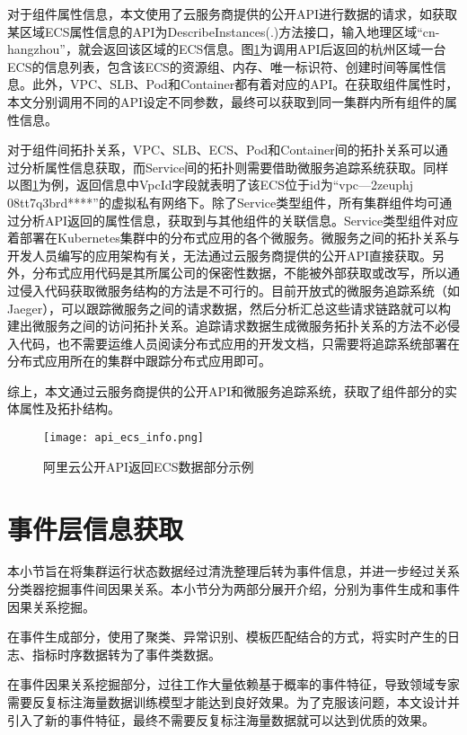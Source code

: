 对于组件属性信息，本文使用了云服务商提供的公开API进行数据的请求，如获取某区域ECS属性信息的API为DescribeInstances(.)方法接口，输入地理区域“cn-hangzhou”，就会返回该区域的ECS信息。图\ref{api_ecs_info}为调用API后返回的杭州区域一台ECS的信息列表，包含该ECS的资源组、内存、唯一标识符、创建时间等属性信息。此外，VPC、SLB、Pod和Container都有着对应的API。在获取组件属性时，本文分别调用不同的API设定不同参数，最终可以获取到同一集群内所有组件的属性信息。

对于组件间拓扑关系，VPC、SLB、ECS、Pod和Container间的拓扑关系可以通过分析属性信息获取，而Service间的拓扑则需要借助微服务追踪系统获取。同样以图\ref{api_ecs_info}为例，返回信息中VpcId字段就表明了该ECS位于id为“vpc—2zeuphj 08tt7q3brd****”的虚拟私有网络下。除了Service类型组件，所有集群组件均可通过分析API返回的属性信息，获取到与其他组件的关联信息。Service类型组件对应着部署在Kubernetes集群中的分布式应用的各个微服务。微服务之间的拓扑关系与开发人员编写的应用架构有关，无法通过云服务商提供的公开API直接获取。另外，分布式应用代码是其所属公司的保密性数据，不能被外部获取或改写，所以通过侵入代码获取微服务结构的方法是不可行的。目前开放式的微服务追踪系统（如Jaeger\cite{mengistu2020distributed}），可以跟踪微服务之间的请求数据，然后分析汇总这些请求链路就可以构建出微服务之间的访问拓扑关系。追踪请求数据生成微服务拓扑关系的方法不必侵入代码，也不需要运维人员阅读分布式应用的开发文档，只需要将追踪系统部署在分布式应用所在的集群中跟踪分布式应用即可。

综上，本文通过云服务商提供的公开API和微服务追踪系统，获取了组件部分的实体属性及拓扑结构。
\begin{figure}[htbp]
    \centering
    \texttt{[image: api\_ecs\_info.png]}
    \caption{阿里云公开API返回ECS数据部分示例\label{api_ecs_info}}
\end{figure}

\section{事件层信息获取}
本小节旨在将集群运行状态数据经过清洗整理后转为事件信息，并进一步经过关系分类器挖掘事件间因果关系。本小节分为两部分展开介绍，分别为事件生成和事件因果关系挖掘。

在事件生成部分，使用了聚类、异常识别、模板匹配结合的方式，将实时产生的日志、指标时序数据转为了事件类数据。

在事件因果关系挖掘部分，过往工作大量依赖基于概率的事件特征，导致领域专家需要反复标注海量数据训练模型才能达到良好效果。为了克服该问题，本文设计并引入了新的事件特征，最终不需要反复标注海量数据就可以达到优质的效果。
